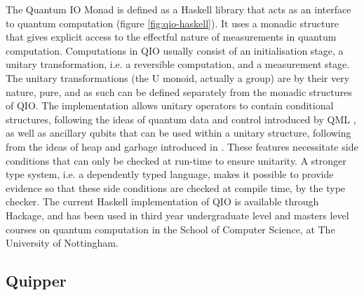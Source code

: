 \documentclass[a4paper]{article}
\begin{document}
The Quantum IO Monad  is defined as a
Haskell library that acts as an interface to quantum computation
(figure \ref{fig:qio-haskell}). It uses a monadic structure that gives
explicit access to the effectful nature of measurements in quantum
computation.  Computations in QIO usually consist of an initialisation
stage, a unitary transformation, i.e. a reversible computation, and a
measurement stage. The unitary transformations (the U monoid, actually
a group) are by their very nature, pure, and as such can be defined
separately from the monadic structures of QIO. The implementation
allows unitary operators to contain conditional structures, following
the ideas of quantum data and control introduced by QML
, as well as ancillary qubits that can be used
within a unitary structure, following from the ideas of heap and
garbage introduced in . These features
necessitate side conditions that can only be checked at run-time to
ensure unitarity.
A stronger type system, i.e. a dependently typed language, makes it
possible to provide evidence so that these side conditions are
checked at compile time, by the type checker. The current Haskell
implementation of QIO is available through Hackage,
and has been used in third year undergraduate level and masters level
courses on quantum computation in the School of Computer Science, at
The University of Nottingham.

\subsection*{Quipper}
\end{document}
